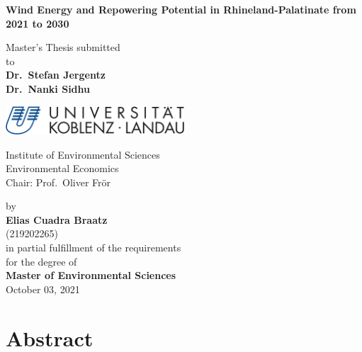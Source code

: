 \documentclass[a4paper,11pt]{article}
\begin{document}
\thispagestyle{empty}
\begin{center}
  \vspace*{5mm}
  \linespread{1.5}
  {\huge{\bf Wind Energy and Repowering Potential in Rhineland-Palatinate from 2021 to 2030}\par}\vspace{1cm}
  Master's Thesis submitted \\\vspace{0.5cm}
  to \\\vspace{0.5cm}
  \textbf{Dr.~Stefan Jergentz} \\
  \textbf{Dr.~Nanki Sidhu} \\\vspace{1.5cm}
  
  
  \includegraphics[width=0.5\textwidth]{Uni-Logo-2.jpg}
  
  Institute of Environmental Sciences \\
  Environmental Economics \\
   Chair: Prof.~Oliver Frör \\  \vspace{1cm}

  
  
  by \\\vspace{0.5cm}
  \textbf{Elias Cuadra Braatz} \\
  (219202265) \\
  
  \medskip
  \medskip
  in partial fulfillment of the requirements \\
  for the degree of \\
  \textbf{Master of Environmental Sciences} \\\vspace{0.5cm}
  October 03, 2021
  
\end{center}


\newpage
\tableofcontents
\clearpage

\newpage
\hypertarget{abstract}{%
\section*{Abstract}\label{abstract}}
\end{document}
